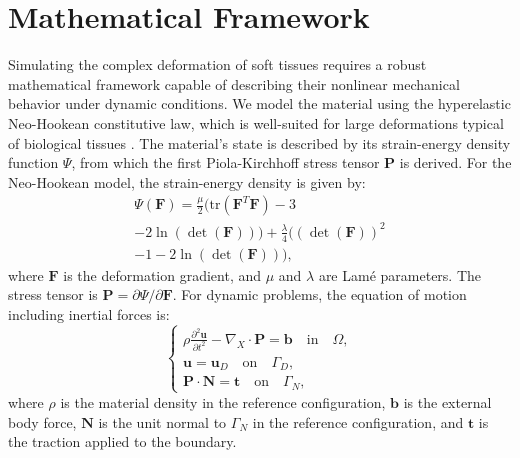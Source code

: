 \documentclass[11pt,a4paper,twocolumn]{article}
\begin{document}
\section{Mathematical Framework}
\label{sec:es:mathematical_framework}

Simulating the complex deformation of soft tissues requires a robust mathematical framework capable of describing their nonlinear mechanical behavior under dynamic conditions. We model the material using the hyperelastic Neo-Hookean constitutive law, which is well-suited for large deformations typical of biological tissues \cite{Ogden_1997}. The material's state is described by its strain-energy density function $\Psi$, from which the first Piola-Kirchhoff stress tensor $\bm{P}$ is derived. For the Neo-Hookean model, the strain-energy density is given by:
\begin{equation}
\begin{split}
        \Psi(\bm{F}) = \frac{\mu}{2} (\text{tr}(\bm{F}^T\bm{F}) - 3 \\- 2\ln(\det(\bm{F}))) + \frac{\lambda}{4} ((\det(\bm{F}))^2\\ - 1 - 2\ln(\det(\bm{F}))),
\end{split}
\label{eq:es:neo_hookean_energy}
\end{equation}
where $\bm{F}$ is the deformation gradient, and $\mu$ and $\lambda$ are Lamé parameters. The stress tensor is $\bm{P} = \partial \Psi / \partial \bm{F}$. For dynamic problems, the equation of motion including inertial forces is:
\begin{equation}
    \begin{cases}
        \rho \frac{\partial^2 \bm{u}}{\partial t^2} - \nabla_X \cdot \bm{P} = \bm{b} \quad \text{in} \quad \Omega, \\
        \bm{u} = \bm{u}_D \quad \text{on} \quad \Gamma_D, \\
        \bm{P} \cdot \bm{N} = \bm{t} \quad \text{on} \quad \Gamma_N,
    \end{cases}
\label{eq:dynamic_problem}
\end{equation}
where $\rho$ is the material density in the reference configuration, $\bm{b}$ is the external body force, $\bm{N}$ is the unit normal to $\Gamma_N$ in the reference configuration, and $\bm{t}$ is the traction applied to the boundary.
\end{document}
